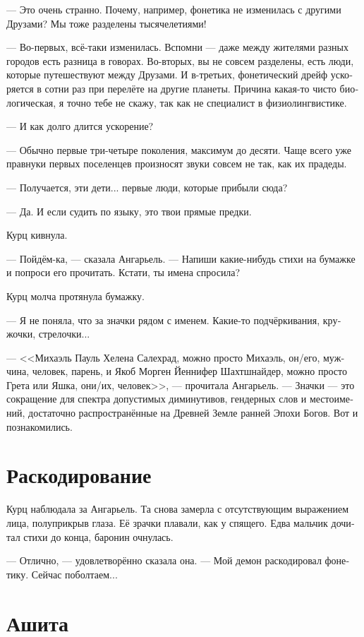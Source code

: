 \documentclass[a4paper,12pt,fleqn]{book}\usepackage{cooltooltips}\usepackage{polyglossia}\setdefaultlanguage[babelshorthands=true]{russian}\setotherlanguage{english}\defaultfontfeatures{Ligatures=TeX,Mapping=tex-text} \usepackage{xcolor}\definecolor{lightgray}{HTML}{bbbbbb}\color{lightgray}\newcommand{\ml}[3]{\textenglish{\textcolor{black}{#3}}}
\begin{document}
--- Это очень странно.
Почему, например, фонетика не изменилась с другими Друзами?
Мы тоже разделены тысячелетиями!

--- Во-первых, всё-таки изменилась.
Вспомни --- даже между жителями разных городов есть разница в говорах.
Во-вторых, вы не совсем разделены, есть люди, которые путешествуют между Друзами.
И в-третьих, фонетический дрейф ускоряется в сотни раз при перелёте на другие планеты.
Причина какая-то чисто биологическая, я точно тебе не скажу, так как не специалист в физиолингвистике.

--- И как долго длится ускорение?

--- Обычно первые три-четыре поколения, максимум до десяти.
Чаще всего уже правнуки первых поселенцев произносят звуки совсем не так, как их прадеды.

--- Получается, эти дети... первые люди, которые прибыли сюда?

--- Да.
И если судить по языку, это твои прямые предки.

Курц кивнула.

--- Пойдём-ка, --- сказала Ангарьель.
--- Напиши какие-нибудь стихи на бумажке и попроси его прочитать.
Кстати, ты имена спросила?

Курц молча протянула бумажку.

--- Я не поняла, что за значки рядом с именем.
Какие-то подчёркивания, кружочки, стрелочки...

--- <<Михаэль Пауль Хелена Салехрад, можно просто Михаэль, он/его, мужчина, человек, парень, и Якоб Морген Йеннифер Шахтшнайдер, можно просто Грета или Яшка, они/их, человек>>, --- прочитала Ангарьель.
--- Значки --- это сокращение для спектра допустимых диминутивов, гендерных слов и местоимений, достаточно распространённые на Древней Земле ранней Эпохи Богов.
Вот и познакомились.

\section{Раскодирование}

Курц наблюдала за Ангарьель.
Та снова замерла с отсутствующим выражением лица, полуприкрыв глаза.
Её зрачки плавали, как у спящего.
Едва мальчик дочитал стихи до конца, баронин очнулась.

--- Отлично, --- удовлетворённо сказала она.
--- Мой демон раскодировал фонетику.
Сейчас поболтаем...

\section{Ашита}
\end{document}
